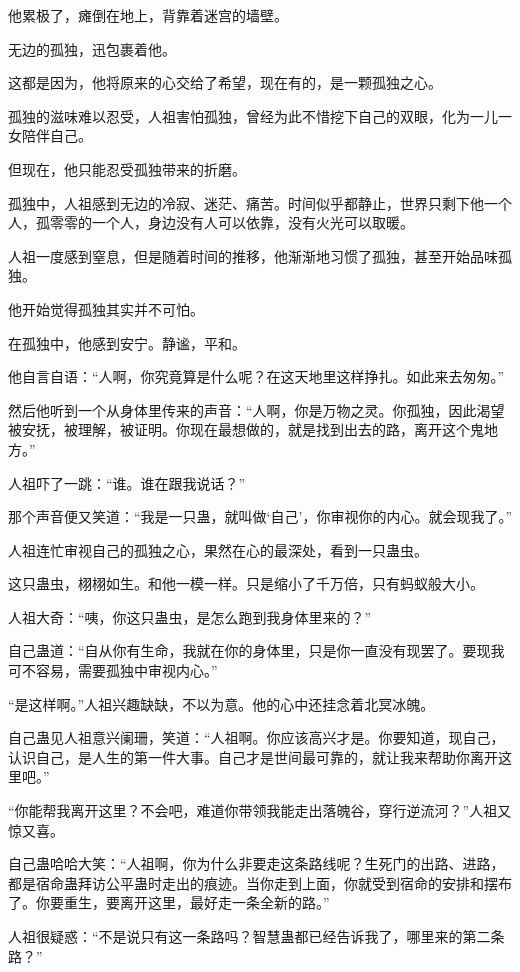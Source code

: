 \begin{this_body}
他累极了，瘫倒在地上，背靠着迷宫的墙壁。

无边的孤独，迅包裹着他。

这都是因为，他将原来的心交给了希望，现在有的，是一颗孤独之心。

孤独的滋味难以忍受，人祖害怕孤独，曾经为此不惜挖下自己的双眼，化为一儿一女陪伴自己。

但现在，他只能忍受孤独带来的折磨。

孤独中，人祖感到无边的冷寂、迷茫、痛苦。时间似乎都静止，世界只剩下他一个人，孤零零的一个人，身边没有人可以依靠，没有火光可以取暖。

人祖一度感到窒息，但是随着时间的推移，他渐渐地习惯了孤独，甚至开始品味孤独。

他开始觉得孤独其实并不可怕。

在孤独中，他感到安宁。静谧，平和。

他自言自语：“人啊，你究竟算是什么呢？在这天地里这样挣扎。如此来去匆匆。”

然后他听到一个从身体里传来的声音：“人啊，你是万物之灵。你孤独，因此渴望被安抚，被理解，被证明。你现在最想做的，就是找到出去的路，离开这个鬼地方。”

人祖吓了一跳：“谁。谁在跟我说话？”

那个声音便又笑道：“我是一只蛊，就叫做‘自己’，你审视你的内心。就会现我了。”

人祖连忙审视自己的孤独之心，果然在心的最深处，看到一只蛊虫。

这只蛊虫，栩栩如生。和他一模一样。只是缩小了千万倍，只有蚂蚁般大小。

人祖大奇：“咦，你这只蛊虫，是怎么跑到我身体里来的？”

自己蛊道：“自从你有生命，我就在你的身体里，只是你一直没有现罢了。要现我可不容易，需要孤独中审视内心。”

“是这样啊。”人祖兴趣缺缺，不以为意。他的心中还挂念着北冥冰魄。

自己蛊见人祖意兴阑珊，笑道：“人祖啊。你应该高兴才是。你要知道，现自己，认识自己，是人生的第一件大事。自己才是世间最可靠的，就让我来帮助你离开这里吧。”

“你能帮我离开这里？不会吧，难道你带领我能走出落魄谷，穿行逆流河？”人祖又惊又喜。

自己蛊哈哈大笑：“人祖啊，你为什么非要走这条路线呢？生死门的出路、进路，都是宿命蛊拜访公平蛊时走出的痕迹。当你走到上面，你就受到宿命的安排和摆布了。你要重生，要离开这里，最好走一条全新的路。”

人祖很疑惑：“不是说只有这一条路吗？智慧蛊都已经告诉我了，哪里来的第二条路？”


\end{this_body}

